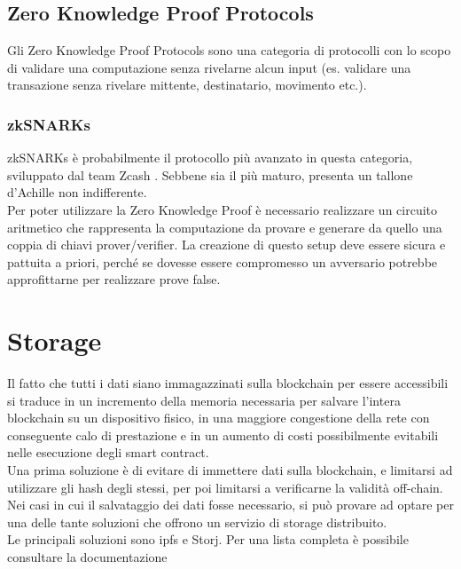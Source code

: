 \subsection{Zero Knowledge Proof Protocols}
Gli Zero Knowledge Proof Protocols sono una categoria di protocolli con lo scopo di validare una computazione senza rivelarne alcun input (es. validare una transazione senza rivelare mittente, destinatario, movimento etc.).

\subsubsection{zkSNARKs}
zkSNARKs è probabilmente il protocollo più avanzato in questa categoria, sviluppato dal team Zcash \cite{wiki:zkSNARKs}.
Sebbene sia il più maturo, presenta un tallone d'Achille non indifferente. \\
Per poter utilizzare la Zero Knowledge Proof è necessario realizzare un circuito aritmetico che rappresenta la computazione da provare e generare da quello una coppia di chiavi prover/verifier.
La creazione di questo setup deve essere sicura e pattuita a priori, perché se dovesse essere compromesso un avversario potrebbe approfittarne per realizzare prove false.

\section{Storage}
Il fatto che tutti i dati siano immagazzinati sulla blockchain per essere accessibili si traduce in un incremento della memoria necessaria per salvare l'intera blockchain su un dispositivo fisico,
in una maggiore congestione della rete con conseguente calo di prestazione e in un aumento di costi possibilmente evitabili nelle esecuzione degli smart contract. \\
Una prima soluzione è di evitare di immettere dati sulla blockchain, e limitarsi ad utilizzare gli hash degli stessi, per poi limitarsi a verificarne la validità off-chain. \\
Nei casi in cui il salvataggio dei dati fosse necessario, si può provare ad optare per una delle tante soluzioni che offrono un servizio di storage distribuito. \\
Le principali soluzioni sono \gls{ipfs} e Storj.
Per una lista completa è possibile consultare la documentazione \cite{wiki:ew-storage}

